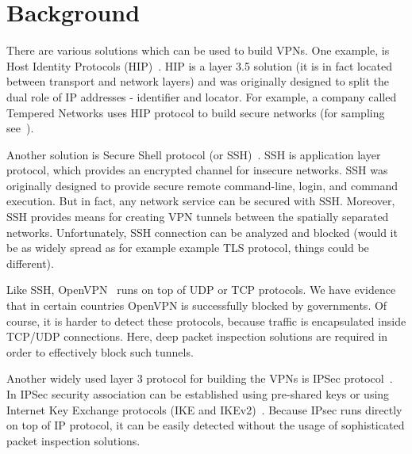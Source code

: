 \section{Background}
\label{section:background}

There are various solutions which can be used to build VPNs.
One example, is Host Identity Protocols (HIP)~\cite{gurtov2008host}. 
HIP is a layer 3.5 solution (it is in fact located between transport
and network layers) and was originally designed to 
split the dual role of IP addresses - identifier and locator.
For example, a company called Tempered Networks uses HIP protocol
to build secure networks (for sampling see~\cite{temperednetworks}).

Another solution is Secure Shell protocol (or SSH)~\cite{ssh}. SSH is
application layer protocol, which provides an encrypted channel for insecure
networks. SSH was originally designed to provide secure  
remote command-line, login, and command execution. But in fact, 
any network service can be secured with SSH. Moreover, SSH provides
means for creating VPN tunnels between the spatially separated networks.
Unfortunately, SSH connection can be analyzed and blocked (would it be as 
widely spread as for example example TLS protocol, things could be different).

Like SSH, OpenVPN~\cite{openvpn} runs on top of UDP or TCP protocols.
We have evidence that in certain countries OpenVPN is successfully blocked 
by governments. Of course, it is harder to detect these protocols, because 
traffic is encapsulated inside TCP/UDP connections. Here, deep packet
inspection solutions are required in order to effectively block such tunnels.

Another widely used layer 3 protocol for building the VPNs is IPSec 
protocol~\cite{ipsec}. In IPSec security association can be established using 
pre-shared keys or using Internet Key Exchange protocols (IKE and IKEv2)~\cite{ike}.
Because IPsec runs directly on top of IP protocol, it can be easily detected without
the usage of sophisticated packet inspection solutions.
  